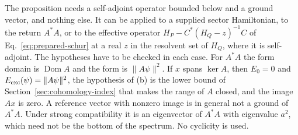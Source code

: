The proposition needs a self-adjoint operator bounded below and a ground vector, and nothing else. It can be applied to a supplied sector Hamiltonian, to the return $A^*A$, or to the effective operator $H_P-C^*(H_Q-z)^{-1}C$ of Eq.~\eqref{eq:prepared-schur} at a real $z$ in the resolvent set of $H_Q$, where it is self-adjoint. The hypotheses have to be checked in each case. For $A^*A$ the form domain is $\operatorname{Dom}A$ and the form is $\|A\psi\|^2$. If $x$ spans $\ker A$, then $E_0=0$ and $E_{\rm exc}(\psi)=\|A\psi\|^2$, the hypothesis of (b) is the lower bound of Section~\ref{sec:cohomology-index} that makes the range of $A$ closed, and the image $Ax$ is zero. A reference vector with nonzero image is in general not a ground of $A^*A$. Under strong compatibility it is an eigenvector of $A^*A$ with eigenvalue $a^2$, which need not be the bottom of the spectrum. No cyclicity is used.
